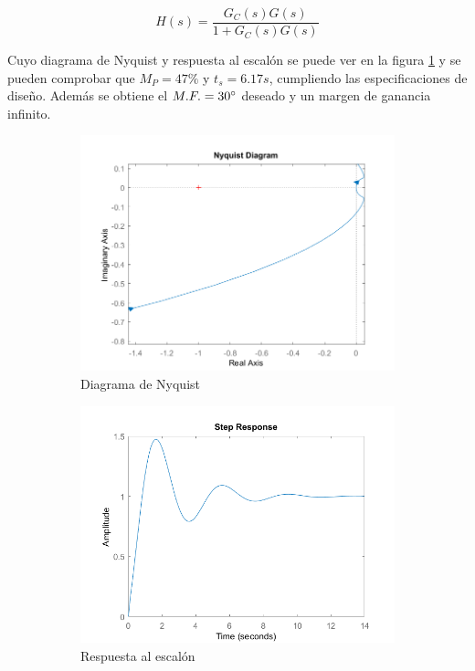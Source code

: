 \documentclass[a4paper]{article}
\begin{document}
\begin{equation}
H(s)=\frac{G_C(s) G(s)}{1 + G_C(s) G(s)}
\end{equation}

Cuyo diagrama de Nyquist y respuesta al escalón se puede ver en la figura \ref{fig:sim} y se pueden comprobar que $M_P=47\%$ y $t_s=6.17 s$, cumpliendo las especificaciones de diseño. Además se obtiene el $M.F. = 30\degree$ deseado y un margen de ganancia infinito.

\begin{center}
	\begin{figure}[htp]
		\begin{subfigure}{1\textwidth}
			\centering
			\includegraphics[width=12cm]{nyquist2}
			\caption{Diagrama de Nyquist}
		\end{subfigure}
		
		\begin{subfigure}{1\textwidth}
			\centering
			\includegraphics[width=12cm]{respuesta}
			\caption{Respuesta al escalón}
		\end{subfigure}
		\caption{}
		\label{fig:sim}
	\end{figure}
\end{center}
\end{document}
